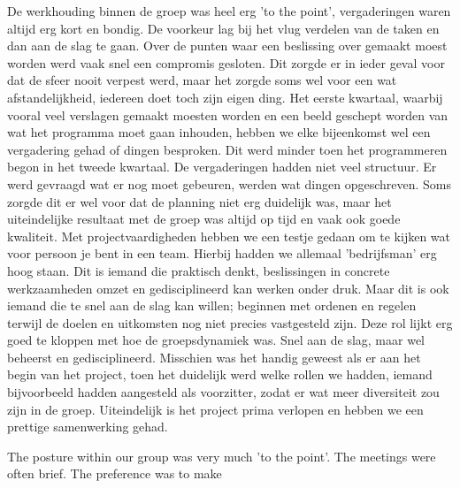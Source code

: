 De werkhouding binnen de groep was heel erg 'to the point', vergaderingen waren altijd erg kort en bondig. De voorkeur lag bij het vlug verdelen van de taken en dan aan de slag te gaan. Over de punten waar een beslissing over gemaakt moest worden werd vaak snel een compromis gesloten. Dit zorgde er in ieder geval voor dat de sfeer nooit verpest werd, maar het zorgde soms wel voor een wat afstandelijkheid, iedereen doet toch zijn eigen ding. Het eerste kwartaal, waarbij vooral veel verslagen gemaakt moesten worden en een beeld geschept worden van wat het programma moet gaan inhouden, hebben we elke bijeenkomst wel een vergadering gehad of dingen besproken. Dit werd minder toen het programmeren begon in het tweede kwartaal. De vergaderingen hadden niet veel structuur. Er werd gevraagd wat er nog moet gebeuren, werden wat dingen opgeschreven. Soms zorgde dit er wel voor dat de planning niet erg duidelijk was, maar het uiteindelijke resultaat met de groep was altijd op tijd en vaak ook goede kwaliteit. 
Met projectvaardigheden hebben we een testje gedaan om te kijken wat voor persoon je bent in een team. Hierbij hadden we allemaal 'bedrijfsman' erg hoog staan. Dit is iemand die praktisch denkt, beslissingen in concrete werkzaamheden omzet en gedisciplineerd kan werken onder druk. Maar dit is ook iemand die te snel aan de slag kan willen; beginnen met ordenen en regelen terwijl de doelen en uitkomsten nog niet precies vastgesteld zijn. Deze rol lijkt erg goed te kloppen met hoe de groepsdynamiek was. Snel aan de slag, maar wel beheerst en gedisciplineerd. Misschien was het handig geweest als er aan het begin van het project, toen het duidelijk werd welke rollen we hadden, iemand bijvoorbeeld hadden aangesteld als voorzitter, zodat er wat meer diversiteit zou zijn in de groep. 
Uiteindelijk is het project prima verlopen en hebben we een prettige samenwerking gehad.

The posture within our group was very much 'to the point'. The meetings were often brief. The preference was to make 